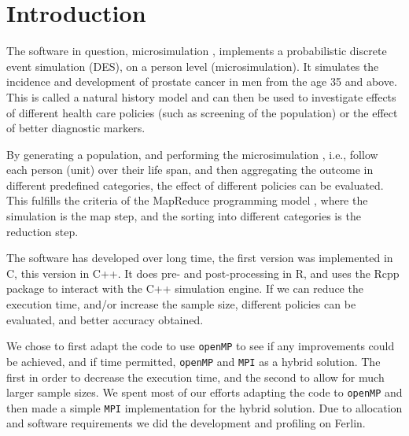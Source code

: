 \section{Introduction}

The software in question, microsimulation \cite{microsimulation},
implements a probabilistic discrete event simulation (DES), on a
person level (microsimulation). It simulates the incidence and development of prostate cancer
in men from the age 35 and above. This is called a natural history
model and can then be used to investigate effects of different health
care policies (such as screening of the population) or the effect of
better diagnostic markers.

By generating a population, and performing the microsimulation \citep{gulati_calibrating_2010},
i.e., follow each person (unit) over their life span, and then
aggregating the outcome in different predefined categories, the effect of
different policies can be evaluated. This fulfills the criteria of the
MapReduce programming model \cite{MapReduce:2004}, where the
simulation is the map step, and the sorting into different categories
is the reduction step.

The software has developed over long time, the first version was
implemented in C, this version in C++. It does pre- and post-processing
in R, and uses the Rcpp \citep{rcpp} package to interact with the C++
simulation engine. If we can reduce the execution time, and/or
increase the sample size, different policies can be evaluated, and
better accuracy obtained.

We chose to first adapt the code to use \texttt{openMP} to see if any
improvements could be achieved, and if time permitted, \texttt{openMP}
and \texttt{MPI} as a hybrid solution. The first in order to decrease
the execution time, and the second to allow for much larger sample
sizes. We spent most of our efforts adapting the code to
\texttt{openMP} and then made a simple \texttt{MPI} implementation for
the hybrid solution. Due to allocation and software requirements we
did the development and profiling on Ferlin.







